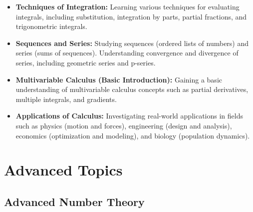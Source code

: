 \documentclass[openany]{book}
\begin{document}
\begin{itemize}
    \item \textbf{Techniques of Integration:} Learning various techniques for evaluating integrals, including substitution, integration by parts, partial fractions, and trigonometric integrals.
    \item \textbf{Sequences and Series:} Studying sequences (ordered lists of numbers) and series (sums of sequences). Understanding convergence and divergence of series, including geometric series and p-series.
    \item \textbf{Multivariable Calculus (Basic Introduction):} Gaining a basic understanding of multivariable calculus concepts such as partial derivatives, multiple integrals, and gradients.
    \item \textbf{Applications of Calculus:} Investigating real-world applications in fields such as physics (motion and forces), engineering (design and analysis), economics (optimization and modeling), and biology (population dynamics).
\end{itemize}
\chapter{Advanced Topics}
\section{Advanced Number Theory}
\end{document}
